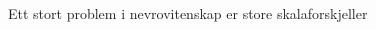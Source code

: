 \documentclass[presentation]{beamer}
\begin{document}
\begin{frame}{Ett stort problem i nevrovitenskap er store skalaforskjeller}
    \begin{columns}
    \begin{column}{0.5\textwidth}
        \begin{center}
        \begin{figure}
     \end{figure}
    \end{center}
    \end{column}
    \begin{column}{0.5\textwidth}  %
        \begin{center}

\end{center}
\end{column}
\end{columns}
\end{frame}
\end{document}
